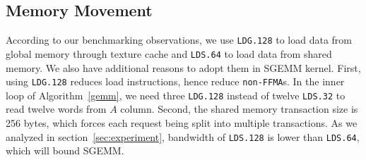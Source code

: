 \subsection{Memory Movement}
According to our benchmarking observations, we use {\tt LDG.128} to load data from global memory through texture cache
and {\tt LDS.64} to load data from shared memory.
We also have additional reasons to adopt them in SGEMM kernel.
First, using {\tt LDG.128} reduces load instructions, hence reduce {\tt non-FFMA}s. %
In the inner loop of Algorithm~\ref{gemm}, we need three {\tt LDG.128} instead of twelve {\tt LDS.32} to read twelve
words from $A$ column. Second, the shared memory transaction size is 256 bytes, which forces each request being split into multiple transactions.
As we analyzed in section~\ref{sec:experiment}, bandwidth of {\tt LDS.128} is lower than {\tt LDS.64}, which will bound
SGEMM.
